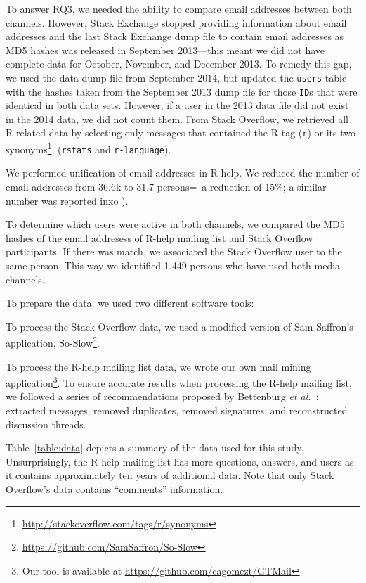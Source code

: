 \documentclass[smallextended]{svjour3}       %
\newcommand{\SO}{Stack Overflow\xspace}
\newcommand{\RH}{R-help\xspace}
\begin{document}
To answer RQ3, we needed the ability to compare email addresses
between both channels. However, Stack Exchange stopped providing
information about email addresses and the last Stack Exchange dump
file to contain email addresses as MD5 hashes was released in
September 2013---this meant we did not have complete data for October,
November, and December 2013.  To remedy this gap, we used the data
dump file from September 2014, but updated the \texttt{users} table
with the hashes taken from the September 2013 dump file for those
\texttt{ID}s that were identical in both data sets.  However, if a
user in the 2013 data file did not exist in the 2014 data, we did not
count them.  From \SO, we retrieved all R-related data by selecting
only messages that contained the R tag (\texttt{r}) or its two
synonyms\footnote{\url{http://stackoverflow.com/tags/r/synonyms}},
(\texttt{rstats} and \texttt{r-language}).

We performed unification of email addresses in \RH. We reduced the
number of email addresses from 36.6k to 31.7 persons=--a reduction of 15\%; a similar number was reported inxo
\cite{Vasilescu2014c}).

To determine which users were active in both channels, we compared the
MD5 hashes of the email addresess of \RH mailing list and \SO participants. If there was
match, we associated the \SO user to the same person. This way we
identified 1,449 persons who have used both media channels.
    
To prepare the data, we used two different software tools:
    \begin{enumerate*}[label=(\arabic*)]
    \item To process the \SO data, we used a modified version of Sam Saffron's application, So-Slow\footnote{\url{https://github.com/SamSaffron/So-Slow}}.
    \item To process the \RH mailing list data, we wrote our own mail mining application\footnote{Our tool is available at
            \url{https://github.com/cagomezt/GTMail}}. To ensure accurate results when processing the \RH mailing list, we followed a series of recommendations proposed by Bettenburg \textit{et al.}~\cite{Bettenburg2009}: extracted messages, removed duplicates, removed signatures, and reconstructed discussion threads.
    \end{enumerate*}
Table~\ref{table:data} depicts a summary of the data used for this study. Unsurprisingly, the \RH mailing list has more questions, answers, and users as it contains approximately ten years of additional data.
Note that only \SO's data contains ``comments'' information.
\end{document}

